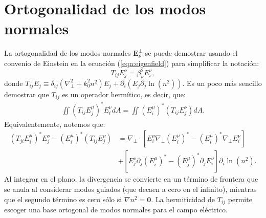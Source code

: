 \chapter{Ortogonalidad de los modos normales \label{sec:orto}}

La ortogonalidad de los modos normales $\textbf{E}_\nu^\perp$ se puede demostrar usando el convenio de Einstein en la ecuación (\ref{eqn:eigenfield}) para simplificar la notación:
\begin{equation}
	T_{ij} E^\nu_j = \beta_\nu^2 E^\nu_i, \label{eqn:eigentensorial}
\end{equation}
donde $T_{ij}E_j \equiv \delta_{ij}\left(\nabla_\perp^2 + k_0^2n^2\right)E_j+\partial_i \left(E_j  \partial_j\ln(n^2) \right) $. Es un poco más sencillo demostrar que $T_{ij}$ es un operador hermítico, es decir, que:
\begin{align*}
	\iint \left(T_{ij} E_j^\mu \right)^*  E_i^\nu dA = \iint \left( E_i^\mu \right)^*  \left(T_{ij} E_j^\nu\right) dA .
\end{align*}
Equivalentemente, notemos que:
\begin{align*}
	\left(T_{ji} E_i^\mu \right)^* E_j^\nu  - \left( E_i^\mu \right)^*  \left(T_{ij} E_j^\nu \right) &= \nabla_\perp \cdot \left[E_i^\nu \nabla_\perp \left( E_i^\mu \right)^* - \left( E_i^\mu \right)^* \nabla_\perp E_i^\nu \right] 
	\\	
	&+ \left[E^\nu_j \partial_j \left( E_i^\mu \right)^*  - \left( E_j^\mu \right)^* \partial_j  E_i^\nu \right] \partial_i \ln(n^2).  
\end{align*}
Al integrar en el plano, la divergencia se convierte en un término de frontera que se anula al considerar modos guiados (que decaen a cero en el infinito), mientras que el segundo término es cero sólo si $\nabla n^2 = \textbf{0}$. La hermiticidad de $T_{ij}$ permite escoger una base ortogonal de modos normales para el campo eléctrico. 

